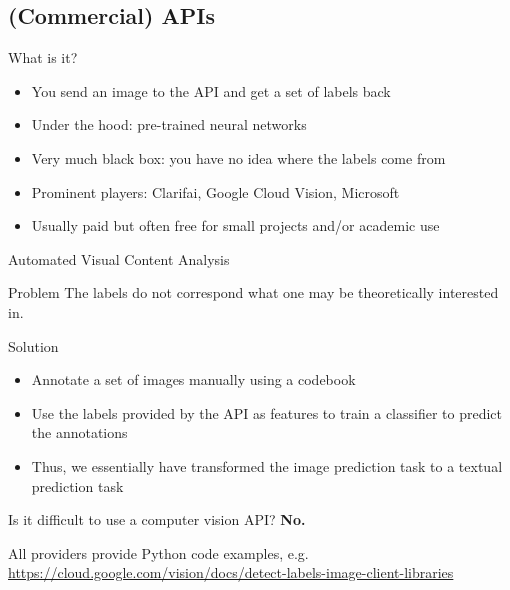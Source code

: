  



\subsection{(Commercial) APIs}

\begin{frame}{What is it?}
  \begin{itemize}
  \item You send an image to the API and get a set of labels back
  \item Under the hood: pre-trained neural networks
  \item Very much black box: you have no idea where the labels come from
  \item Prominent players: Clarifai, Google Cloud Vision, Microsoft
  \item Usually paid but often free for small projects and/or academic use
  \end{itemize}

\end{frame}


\begin{frame}{Automated Visual Content Analysis  \parencite{Araujo2020b}}
  \begin{alertblock}{Problem}
The labels do not correspond what one may be theoretically interested in.
  \end{alertblock}

  \pause
  
\begin{block}{Solution}
  \begin{itemize}
  \item Annotate a set of images manually using a codebook
  \item Use the labels provided by the API as features to train a classifier to predict the annotations
  \item Thus, we essentially have transformed the image prediction task to a textual prediction task
  \end{itemize}
\end{block}
\end{frame}



\begin{frame}{Is it difficult to use a computer vision API?}
  \textbf{No.}

All providers provide Python code examples, e.g. \url{https://cloud.google.com/vision/docs/detect-labels-image-client-libraries}
  
\end{frame}



